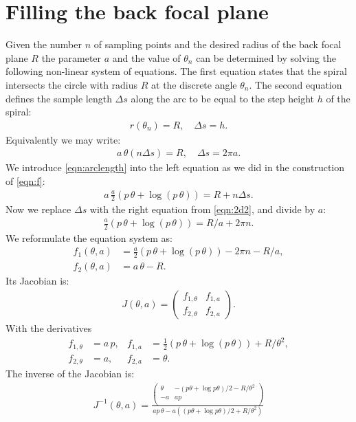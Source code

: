 \documentclass[twocolumn,DIV18]{scrartcl}
\renewcommand{\(}{\left(}
\renewcommand{\)}{\right)}
\begin{document}
\section{Filling the back focal plane}
Given the number $n$ of sampling points and the desired radius of the
back focal plane $R$ the parameter $a$ and the value of $\theta_n$ can
be determined by solving the following non-linear system of
equations. The first equation states that the spiral intersects the
circle with radius $R$ at the discrete angle $\theta_n$. The second
equation defines the sample length $\Delta s$ along the arc to be
equal to the step height $h$ of the spiral:
\begin{align}
  r(\theta_n)=R, \quad \Delta s=h.
\end{align}
Equivalently we may write:
\begin{align} \label{eqn:2d2}
  a \, \theta(n \Delta s)=R, \quad \Delta s=2\pi a.
\end{align}
We introduce \eqref{eqn:arclength} into the left equation as we did in
the construction of \eqref{eqn:f}:
\begin{align}
  a \, \frac{a}{2} \(p\,\theta+\log(p\,\theta)\) = R+n\Delta s. 
\end{align}
Now we replace $\Delta s$ with the right equation from
\eqref{eqn:2d2}, and divide by $a$:
\begin{align}
  \frac{a}{2} \(p\,\theta+\log(p\,\theta)\) = R/a +2\pi n. 
\end{align}
We reformulate the equation system as:
\begin{align}
  f_1(\theta,a)&=\frac{a}{2}\(p\,\theta+\log(p\,\theta)\)-2\pi n-R/a,\\
  f_2(\theta,a)&=a\,\theta-R. 
\end{align}
Its Jacobian is:
\begin{align}
  J(\theta,a)=\begin{pmatrix}
  f_{1,\theta} & f_{1,a} \\
  f_{2,\theta} & f_{2,a}
\end{pmatrix}.
\end{align}
With the derivatives
\begin{align}
  f_{1,\theta}&=a\,p, &f_{1,a}&=\frac{1}{2}\(p\,\theta+\log(p\,\theta)\)+R/\theta^2, \\
  f_{2,\theta}&=a, &f_{2,a}&=\theta.
\end{align}
The inverse of the Jacobian is:
\begin{align}
J^{-1}(\theta,a)=\frac{\begin{pmatrix}
    \theta & -(p\theta+\log p\theta)/2-R/\theta^2 \\
    -a & ap\\
\end{pmatrix}}
{ap\,\theta-a\(\(p\theta+\log p\theta\)/2+R/\theta^2\)}
\end{align}
\end{document}
